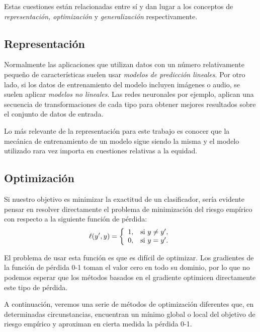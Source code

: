 \documentclass[oneside,openright,titlepage,numbers=noenddot,openany,headinclude,footinclude=true,
cleardoublepage=empty,abstractoff,BCOR=5mm,paper=a4,fontsize=12pt,main=spanish]{scrreprt}
\begin{document}
Estas cuestiones están relacionadas entre sí y dan lugar a los conceptos de \textit{representación, optimización} y \textit{generalización} respectivamente.

\subsection*{Representación}

Normalmente las aplicaciones que utilizan datos con un número relativamente pequeño de características suelen usar \textit{modelos de predicción lineales}. Por otro lado, si los datos de entrenamiento del modelo incluyen imágenes o audio, se suelen aplicar \textit{modelos no lineales}. Las redes neuronales por ejemplo, aplican una secuencia de transformaciones de cada tipo para obtener mejores resultados sobre el conjunto de datos de entrada.

Lo más relevante de la representación para este trabajo es conocer que la mecánica de entrenamiento de un modelo sigue siendo la misma y el modelo utilizado rara vez importa en cuestiones relativas a la equidad.


\subsection*{Optimización}

Si nuestro objetivo es minimizar la exactitud de un clasificador, sería evidente pensar en resolver directamente el problema de minimización del riesgo empírico con respecto a la siguiente función de pérdida: $$\ell(y',y)=\left \{
\begin{array}{l l}
1, & \mbox{si } y\neq y', \\
0, & \mbox{si } y=y'.
\end{array}
\right.$$

El problema de usar esta función es que es difícil de optimizar. Los gradientes de la función de pérdida 0-1 toman el valor cero en todo su dominio, por lo que no podemos esperar que los métodos basados en el gradiente optimicen directamente este tipo de pérdida.

A continuación, veremos una serie de métodos de optimización diferentes que, en determinadas circunstancias, encuentran un mínimo global o local del objetivo de riesgo empírico y aproximan en cierta medida la pérdida 0-1.
\end{document}

